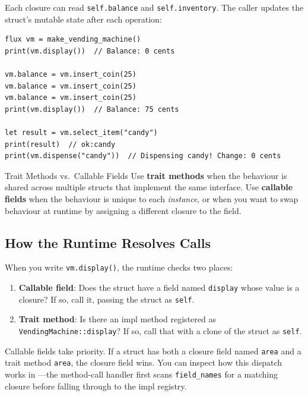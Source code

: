 Each closure can read \lstinline|self.balance| and
\lstinline|self.inventory|. The caller updates the struct's mutable state
after each operation:

\begin{lstlisting}[language=Lattice, caption={Driving the vending machine}]
flux vm = make_vending_machine()
print(vm.display())  // Balance: 0 cents

vm.balance = vm.insert_coin(25)
vm.balance = vm.insert_coin(25)
vm.balance = vm.insert_coin(25)
print(vm.display())  // Balance: 75 cents

let result = vm.select_item("candy")
print(result)  // ok:candy
print(vm.dispense("candy"))  // Dispensing candy! Change: 0 cents
\end{lstlisting}

\begin{tipbox}{Trait Methods vs.\ Callable Fields}
Use \textbf{trait methods} when the behaviour is shared across multiple
structs that implement the same interface. Use \textbf{callable fields}
when the behaviour is unique to each \emph{instance}, or when you want to
swap behaviour at runtime by assigning a different closure to the field.
\end{tipbox}

\subsection{How the Runtime Resolves Calls}

When you write \lstinline|vm.display()|, the runtime checks two places:

\begin{enumerate}
  \item \textbf{Callable field}: Does the struct have a field named
    \lstinline|display| whose value is a closure? If so, call it, passing
    the struct as \lstinline|self|.
  \item \textbf{Trait method}: Is there an impl method registered as
    \lstinline|VendingMachine::display|? If so, call that with a clone
    of the struct as \lstinline|self|.
\end{enumerate}

Callable fields take priority. If a struct has both a closure field named
\lstinline|area| and a trait method \lstinline|area|, the closure field
wins. You can inspect how this dispatch works in ---the
method-call handler first scans \lstinline|field_names| for a matching
closure before falling through to the impl registry.

